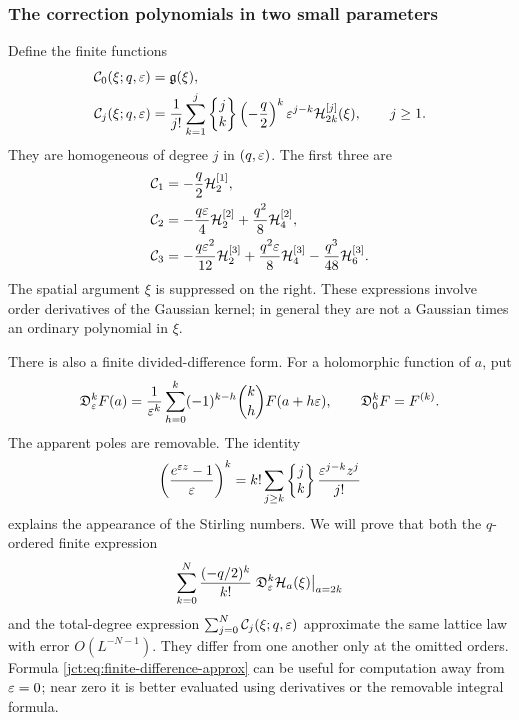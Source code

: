 \subsubsection{The correction polynomials in two small parameters}

Define the finite functions
\begin{align}
 \mathcal C_0(\xi;q,\varepsilon)&=\mathfrak{g}(\xi),\notag\\
 \mathcal C_j(\xi;q,\varepsilon)
 &=\frac1{j!}\sum_{k=1}^j
     \left\{\begin{matrix}j\\k\end{matrix}\right\}\left(-\frac q2\right)^k\varepsilon^{j-k}
           \mathcal{H}_{2k}^{[j]}(\xi),\qquad j\ge1.
           \label{jct:eq:correction}
\end{align}
They are homogeneous of degree $j$ in $(q,\varepsilon)$. The first three are
\begin{align}
 \mathcal C_1&=-\frac q2\mathcal{H}_2^{[1]},\label{jct:eq:C1}\\
 \mathcal C_2&=-\frac{q\varepsilon}{4}\mathcal{H}_2^{[2]}
                  +\frac{q^2}{8}\mathcal{H}_4^{[2]},\label{jct:eq:C2}\\
 \mathcal C_3&=-\frac{q\varepsilon^2}{12}\mathcal{H}_2^{[3]}
             +\frac{q^2\varepsilon}{8}\mathcal{H}_4^{[3]}
             -\frac{q^3}{48}\mathcal{H}_6^{[3]}.
             \label{jct:eq:C3}
\end{align}
The spatial argument $\xi$ is suppressed on the right. These expressions
involve order derivatives of the Gaussian kernel; in general they are
not a Gaussian times an ordinary polynomial in $\xi$.

There is also a finite divided-difference form. For a holomorphic
function of $a$, put
\begin{equation}\label{jct:eq:divided-difference}
 \mathfrak D_\varepsilon^k F(a)
 =\frac1{\varepsilon^k}\sum_{h=0}^k(-1)^{k-h}\binom{k}{h}F(a+h\varepsilon),
 \qquad \mathfrak D_0^k F=F^{(k)}.
\end{equation}
The apparent poles are removable. The identity
\begin{equation}\label{jct:eq:stirling-generating}
 \left(\frac{e^{\varepsilon z}-1}{\varepsilon}\right)^k
 =k!\sum_{j\ge k}\left\{\begin{matrix}j\\k\end{matrix}\right\}\frac{\varepsilon^{j-k}z^j}{j!}
\end{equation}
explains the appearance of the Stirling numbers. We will prove that
both the $q$-ordered finite expression
\begin{equation}\label{jct:eq:finite-difference-approx}
 \sum_{k=0}^N\frac{(-q/2)^k}{k!}
       \left.\mathfrak D_\varepsilon^k\mathcal{H}_a(\xi)\right|_{a=2k}
\end{equation}
and the total-degree expression
$\sum_{j=0}^N\mathcal C_j(\xi;q,\varepsilon)$ approximate the same lattice
law with error $O(L^{-N-1})$. They differ from one another only at
the omitted orders. Formula \eqref{jct:eq:finite-difference-approx}
can be useful for computation away from $\varepsilon=0$; near zero it is
better evaluated using derivatives or the removable integral formula.

